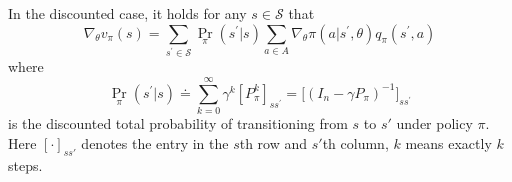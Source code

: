 \documentclass[10pt]{elegantbook}
\begin{document}
\begin{lemma} \label{lemma:gradient_of_value_function}
    In the discounted case, it holds for any $s \in \mathcal S$ that
    \begin{equation} \label{eq:gradient_v_pi}
        \nabla_{\theta}v_{\pi}(s)=\sum_{s^{\prime}\in{\mathcal{S}}}\Pr_{\pi}(s^{\prime}|s)\sum_{a\in A}\nabla_{\theta}\pi(a|s^{\prime},\theta)q_{\pi}(s^{\prime},a)
    \end{equation}
    where
    \[
        \Pr_{\pi}(s^{\prime}|s)\doteq\sum_{k=0}^{\infty}\gamma^{k}[P_{\pi}^{k}]_{s s^{\prime}}=\big[(I_{n}-\gamma P_{\pi})^{-1}\big]_{s s^{\prime}}
    \]
    is the discounted total probability of transitioning from $s$ to $s'$ under policy $\pi$. Here $[\cdot]_{ss'}$ denotes the entry in the $s$th row and 
    $s'$th column, $k$ means exactly $k$ steps.
\end{lemma}
\end{document}
